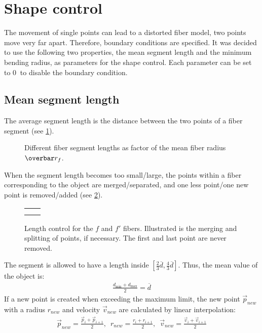 \section{Shape control}\label{chap5:ShapeControl}
% 
The movement of single points can lead to a distorted fiber model, \eg{} two points move very far apart.
Therefore, boundary conditions are specified.
It was decided to use the following two properties, the mean segment length and the minimum bending radius, as parameters for the shape control.
Each parameter can be set to $\SI{0}{}$ to disable the boundary condition.
%
% 
% 
\subsection{Mean segment length}
%
The average segment length is the distance between the two points of a fiber segment (see \cref{fig:modelLength}).
%
\begin{figure}[!t]
    \centering
    \setlength{\tikzwidth}{0.75\textwidth}
	\caption{Different fiber segment lengths as factor of the mean fiber radius $\fiberRadiusMean$.}
	\label{fig:modelLength}
\end{figure}
% 
When the segment length becomes too small/large, the points within a fiber corresponding to the object are merged/separated, and one less point/one new point is removed/added (see \cref{fig:mergeSplit}).
% 
\begin{figure}[!t]
    \centering
    \tikzset{external/export=false}
    \def\forcetikzscale{true}
    \setlength{\tabcolsep}{0pt}
    \setlength{\tikzwidth}{.45\textwidth}
    \begin{tabular}{C{.5\textwidth}C{.5\textwidth}}
     &
     \\
     &
    \end{tabular}
	\caption{Length control for the $f$ and $f'$ fibers. Illustrated is the merging and splitting of points, if necessary. The first and last point are never removed.}
	\label{fig:mergeSplit}
\end{figure}
% 
The segment is allowed to have a length inside $[\frac{2}{3} \overline{d},\frac{4}{3} \overline{d}]$. 
Thus, the mean value of the object is:
\begin{align}
\frac{d_{\min} + d_{\max}}{2} = \overline{d}
\end{align}
%
If a new point is created when exceeding the maximum limit, the new point $\vec{p}_{new}$ with a radius $r_{new}$ and velocity $\vec{v}_{new}$ are calculated by linear interpolation:
\begin{align}
\vec{p}_{new} = \frac{\vec{p}_{i} + \vec{p}_{i+1}}{2},\enspace
r_{new} = \frac{r_{i} + r_{i+1}}{2},\enspace
\vec{v}_{new} = \frac{\vec{v}_{i} + \vec{v}_{i+1}}{2}
\end{align}
%
% 
% 
